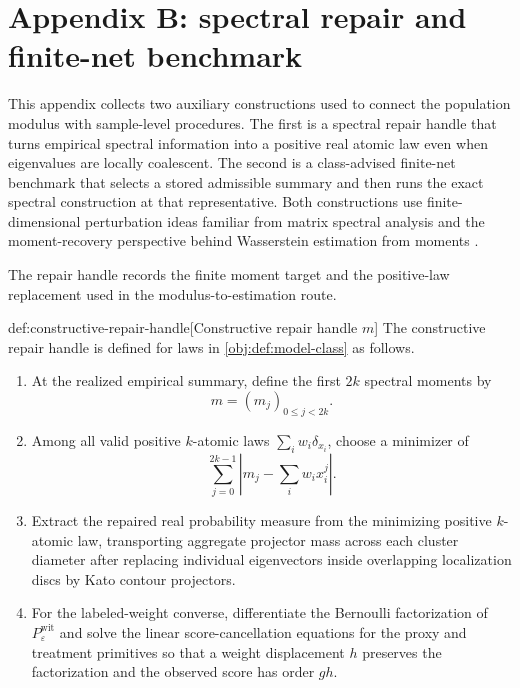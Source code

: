 \section{Appendix B: spectral repair and finite-net benchmark}

This appendix collects two auxiliary constructions used to connect the population modulus with sample-level procedures. The first is a spectral repair handle that turns empirical spectral information into a positive real atomic law even when eigenvalues are locally coalescent. The second is a class-advised finite-net benchmark that selects a stored admissible summary and then runs the exact spectral construction at that representative. Both constructions use finite-dimensional perturbation ideas familiar from matrix spectral analysis \citep{BauerFike1960,Kato1995,DavisKahan1970,StewartSun1990} and the moment-recovery perspective behind Wasserstein estimation from moments \citep{WuYang2020}.

The repair handle records the finite moment target and the positive-law replacement used in the modulus-to-estimation route.

\begin{algorithmv}{def:constructive-repair-handle}[Constructive repair handle \(m\)]
The constructive repair handle is defined for laws in \cref{obj:def:model-class} as follows.
\begin{enumerate}
\item At the realized empirical summary, define the first \(2k\) spectral moments by
\[
m=(m_j)_{0\le j<2k}.
\]
\item Among all valid positive \(k\)-atomic laws \(\sum_i w_i\delta_{x_i}\), choose a minimizer of
\[
\sum_{j=0}^{2k-1}\left|m_j-\sum_i w_i x_i^j\right|.
\]
\item Extract the repaired real probability measure from the minimizing positive \(k\)-atomic law, transporting aggregate projector mass across each cluster diameter after replacing individual eigenvectors inside overlapping localization discs by Kato contour projectors.
\item For the labeled-weight converse, differentiate the Bernoulli factorization of \(P_{\varepsilon}^{\mathrm{wit}}\) and solve the linear score-cancellation equations for the proxy and treatment primitives so that a weight displacement \(h\) preserves the factorization and the observed score has order \(g h\).
\end{enumerate}
\end{algorithmv}

